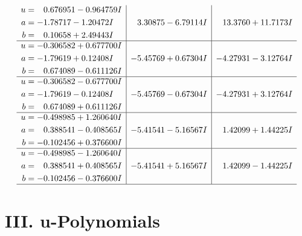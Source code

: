 \documentclass[1p]{elsarticle_modified}
\theoremstyle{definition}
\begin{document}
$$\begin{array}{c|c|c}
\begin{aligned}
u &= \phantom{-}0.676951 - 0.964759 I \\
a &= -1.78717 - 1.20472 I \\
b &= \phantom{-}0.10658 + 2.49443 I\end{aligned}
 & \phantom{-}3.30875 - 6.79114 I & \phantom{-}13.3760 + 11.7173 I \\ \hline\begin{aligned}
u &= -0.306582 + 0.677700 I \\
a &= -1.79619 + 0.12408 I \\
b &= \phantom{-}0.674089 - 0.611126 I\end{aligned}
 & -5.45769 + 0.67304 I & -4.27931 - 3.12764 I \\ \hline\begin{aligned}
u &= -0.306582 - 0.677700 I \\
a &= -1.79619 - 0.12408 I \\
b &= \phantom{-}0.674089 + 0.611126 I\end{aligned}
 & -5.45769 - 0.67304 I & -4.27931 + 3.12764 I \\ \hline\begin{aligned}
u &= -0.498985 + 1.260640 I \\
a &= \phantom{-}0.388541 - 0.408565 I \\
b &= -0.102456 + 0.376600 I\end{aligned}
 & -5.41541 - 5.16567 I & \phantom{-}1.42099 + 1.44225 I \\ \hline\begin{aligned}
u &= -0.498985 - 1.260640 I \\
a &= \phantom{-}0.388541 + 0.408565 I \\
b &= -0.102456 - 0.376600 I\end{aligned}
 & -5.41541 + 5.16567 I & \phantom{-}1.42099 - 1.44225 I\\
 \hline 
 \end{array}$$\newpage
\newpage\renewcommand{\arraystretch}{1}
\centering \section*{ III. u-Polynomials}
\end{document}
